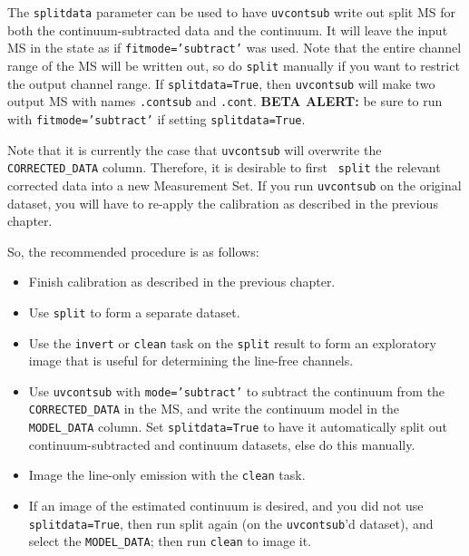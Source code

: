 The {\tt splitdata} parameter can be used to have {\tt uvcontsub}
write out split MS for both the continuum-subtracted data and the
continuum.  It will leave the input MS in the state as if 
{\tt fitmode='subtract'} was used.  Note that the entire channel
range of the MS will be written out, so do {\tt split} manually
if you want to restrict the output channel range.
If {\tt splitdata=True}, then {\tt uvcontsub} will make two output
MS with names {\tt <input msname>.contsub} and {\tt <input msname>.cont}.
{\bf BETA ALERT:} be sure to
run with {\tt fitmode='subtract'} if setting {\tt splitdata=True}.

Note that it is currently the case that {\tt uvcontsub} will overwrite
the {\tt CORRECTED\_DATA} column. Therefore, it is desirable to first {\tt
split} the relevant corrected data into a new Measurement Set.  
If you run {\tt uvcontsub} on the original dataset, you will
have to re-apply the calibration as described in the previous chapter.

So, the recommended procedure is as follows: 

\begin{itemize}
   \item Finish calibration as described in the previous chapter.
   \item Use {\tt split} to form a separate dataset.
   \item Use the {\tt invert} or {\tt clean} task on the {\tt split}
         result to form an exploratory image that is useful for
         determining the line-free channels.
   \item Use {\tt uvcontsub} with {\tt mode='subtract'} to subtract
         the continuum from the {\tt CORRECTED\_DATA} in the MS,
         and write the continuum model in the {\tt MODEL\_DATA} column.
         Set {\tt splitdata=True} to have it automatically split out
         continuum-subtracted and continuum datasets, else do this 
         manually.         
   \item Image the line-only emission with the {\tt clean} task.
   \item If an image of the estimated continuum is desired, and
         you did not use {\tt splitdata=True}, then run split
         again (on the {\tt uvcontsub}'d dataset), and select the 
         {\tt MODEL\_DATA}; then run {\tt clean} to image it.
\end{itemize}

